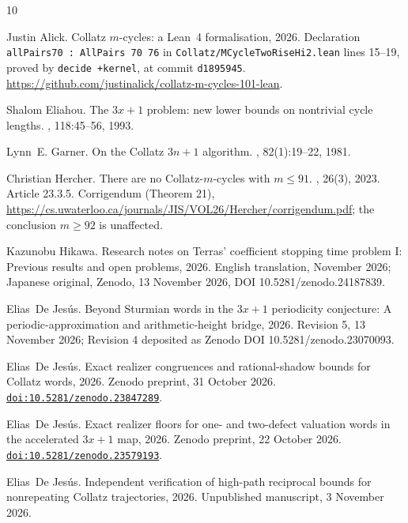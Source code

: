 \documentclass[11pt,a4paper]{article}
\theoremstyle{plain}\newtheorem{theorem}{Theorem}\newtheorem{proposition}[theorem]{Proposition}
\theoremstyle{definition}\newtheorem{example}[theorem]{Example}
\theoremstyle{remark}\newtheorem{remark}[theorem]{Remark}
\begin{document}
\begin{thebibliography}{10}

Justin Alick.
\newblock Collatz $m$-cycles: a {L}ean~4 formalisation, 2026.
\newblock Declaration \texttt{allPairs70 : AllPairs 70 76} in
  \texttt{Collatz/MCycleTwoRiseHi2.lean} lines 15--19, proved by \texttt{decide
  +kernel}, at commit \texttt{d1895945}.
  \url{https://github.com/justinalick/collatz-m-cycles-101-lean}.

Shalom Eliahou.
\newblock The $3x+1$ problem: new lower bounds on nontrivial cycle lengths.
, 118:45--56, 1993.

Lynn~E. Garner.
\newblock On the {C}ollatz $3n+1$ algorithm.
, 82(1):19--22,
  1981.

Christian Hercher.
\newblock There are no {C}ollatz-$m$-cycles with $m\le91$.
, 26(3), 2023.
\newblock Article 23.3.5. Corrigendum (Theorem 21),
  \url{https://cs.uwaterloo.ca/journals/JIS/VOL26/Hercher/corrigendum.pdf}; the
  conclusion $m\ge92$ is unaffected.

Kazunobu Hikawa.
\newblock Research notes on {Terras}' coefficient stopping time problem {I}:
  Previous results and open problems, 2026.
\newblock English translation, November 2026; Japanese original, Zenodo, 13
  November 2026, DOI 10.5281/zenodo.24187839.

Elias~De Jes\'us.
\newblock Beyond {S}turmian words in the $3x+1$ periodicity conjecture: A
  periodic-approximation and arithmetic-height bridge, 2026.
\newblock Revision 5, 13 November 2026; Revision 4 deposited as Zenodo DOI
  10.5281/zenodo.23070093.

Elias~De Jes\'us.
\newblock Exact realizer congruences and rational-shadow bounds for {C}ollatz
  words, 2026.
\newblock Zenodo preprint, 31 October 2026.
  \href{https://doi.org/10.5281/zenodo.23847289}{\texttt{doi:10.5281/zenodo.23847289}}.

Elias~De Jes\'us.
\newblock Exact realizer floors for one- and two-defect valuation words in the
  accelerated $3x+1$ map, 2026.
\newblock Zenodo preprint, 22 October 2026.
  \href{https://doi.org/10.5281/zenodo.23579193}{\texttt{doi:10.5281/zenodo.23579193}}.

Elias~De Jes\'us.
\newblock Independent verification of high-path reciprocal bounds for
  nonrepeating {C}ollatz trajectories, 2026.
\newblock Unpublished manuscript, 3 November 2026.


\end{thebibliography}
\end{document}
